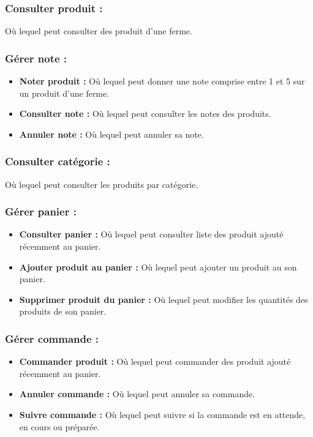 \documentclass[16pt,fleqn]{article} %
\begin{document}
\subsubsection{Consulter produit :}
Où lequel peut consulter des produit d'une ferme.

\subsubsection{Gérer note :}
\begin{itemize}
    \item \textbf{Noter produit :} Où lequel peut donner une note comprise entre 1 et 5 sur un produit d'une ferme.
    \item \textbf{Consulter note :} Où lequel peut consulter les notes des produits.
    \item \textbf{Annuler note :} Où lequel peut annuler sa note.
\end{itemize}

\subsubsection{Consulter catégorie :}
Où lequel peut consulter les produits par catégorie.

\subsubsection{Gérer panier :}
    \begin{itemize}
        \item \textbf{Consulter panier :} Où lequel peut consulter liste des produit ajouté récemment au panier.
        \item \textbf{Ajouter produit au panier :} Où lequel peut ajouter un produit au son panier.
        \item \textbf{Supprimer produit du panier :} Où lequel peut modifier les quantités des produits de son panier.
    \end{itemize}
    
\subsubsection{Gérer commande :}
    \begin{itemize}
        \item \textbf{Commander produit :} Où lequel peut commander des produit ajouté récemment au panier.
        \item \textbf{Annuler commande :} Où lequel peut annuler sa commande.
        \item \textbf{Suivre commande :} Où lequel peut suivre si la commande est en attende, en cours ou préparée.
    \end{itemize}
    
\end{document}
